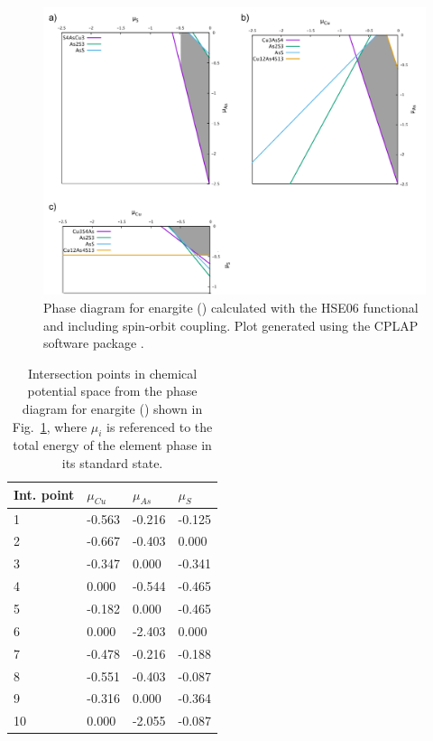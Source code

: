 \documentclass[11pt, twoside]{report}
\begin{document}
\begin{figure}[h!]
    \centering
    \includegraphics[width=1.0\textwidth]{figures/enargite_p_d.png}
    \caption[Phase diagram for enargite ({\enargite}) calculated with the HSE06 functional and including spin-orbit coupling.]{Phase diagram for enargite ({\enargite}) calculated with the HSE06 functional and including spin-orbit coupling. Plot generated using the CPLAP software package \cite{cplap}.}
    \label{enargite_p_d}
\end{figure}

\begin{table}[]
\begin{tabular}{@{}llll@{}}
\toprule
Int. point & $\mu_{Cu}$ & $\mu_{As}$ & $\mu_{S}$ \\ \midrule
1 & -0.563    & -0.216    & -0.125   \\
2 & -0.667    & -0.403    & 0.000    \\
3 & -0.347    & 0.000     & -0.341   \\
4 & 0.000     & -0.544    & -0.465   \\
5 & -0.182    & 0.000     & -0.465   \\
6 & 0.000     & -2.403    & 0.000    \\
7 & -0.478    & -0.216    & -0.188   \\
8 & -0.551    & -0.403    & -0.087   \\
9 & -0.316    & 0.000     & -0.364   \\
10 & 0.000     & -2.055    & -0.087   \\ \bottomrule
\end{tabular}
\caption{Intersection points in chemical potential space from the phase diagram for enargite ({\enargite}) shown in Fig.~\ref{enargite_p_d}, where $\mu_i$ is referenced to the total energy of the element phase in its standard state.}\label{enargite_int_points}
\end{table}
\end{document}
